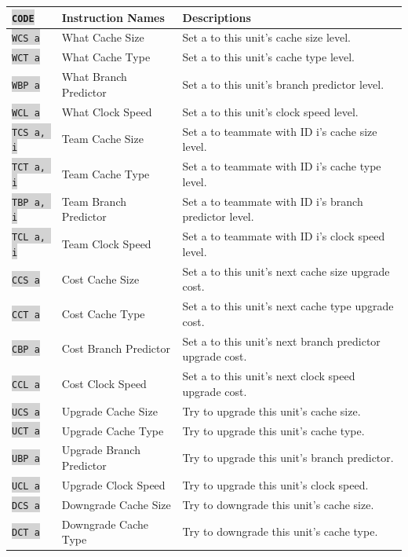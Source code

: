 \documentclass{article}
\newcommand{\vnscode}[1]{\colorbox{lightgray}{\lstinline[language=vns]{#1}}}
\begin{document}
\begin{minipage}{\textwidth}
\label{table:upgrade}
\centering
\begin{tabular}{lll}
    \hline \vnscode{CODE} & Instruction Names & Descriptions \\ \hline
    \vnscode{WCS a} & What Cache Size & Set a to this unit's cache size level.  \\
    \vnscode{WCT a} & What Cache Type & Set a to this unit's cache type level.  \\
    \vnscode{WBP a} & What Branch Predictor & Set a to this unit's branch predictor level. \\
    \vnscode{WCL a} & What Clock Speed & Set a to this unit's clock speed level.  \\
    \vnscode{TCS a, i} & Team Cache Size & Set a to teammate with ID i's cache size level. \\
    \vnscode{TCT a, i} & Team Cache Type & Set a to teammate with ID i's cache type level. \\
    \vnscode{TBP a, i} & Team Branch Predictor & Set a to teammate with ID i's branch predictor level. \\
    \vnscode{TCL a, i} & Team Clock Speed & Set a to teammate with ID i's clock speed level. \\
    \vnscode{CCS a} & Cost Cache Size & Set a to this unit's next cache size upgrade cost. \\
    \vnscode{CCT a} & Cost Cache Type & Set a to this unit's next cache type upgrade cost. \\
    \vnscode{CBP a} & Cost Branch Predictor & Set a to this unit's next branch predictor upgrade cost. \\
    \vnscode{CCL a} & Cost Clock Speed & Set a to this unit's next clock speed upgrade cost. \\
    \vnscode{UCS a} & Upgrade Cache Size & Try to upgrade this unit's cache size. \\
    \vnscode{UCT a} & Upgrade Cache Type & Try to upgrade this unit's cache type. \\
    \vnscode{UBP a} & Upgrade Branch Predictor & Try to upgrade this unit's branch predictor. \\
    \vnscode{UCL a} & Upgrade Clock Speed & Try to upgrade this unit's clock speed. \\
    \vnscode{DCS a} & Downgrade Cache Size & Try to downgrade this unit's cache size. \\
    \vnscode{DCT a} & Downgrade Cache Type & Try to downgrade this unit's cache type. \\

\end{tabular}
\end{minipage}
\end{document}
